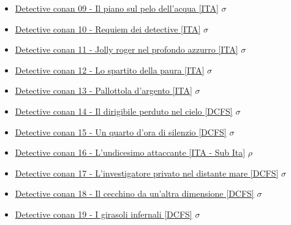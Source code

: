 \begin{itemize}
				\item \href{https://mega.nz/#!5dVBnYQI!Xr37qbfwJcZ3Mf3yrrl5tWFyDnQ4RdwQ-k6Yif0bfgo} {Detective conan 09 - Il piano sul pelo dell'acqua  [ITA]}  $\sigma$   \\
				\item \href{https://mega.nz/#!kQ9wDBTR!yOz1HSF1OcD1P544nv23cEWFpYuPS_ED26GRj0mErZE} {Detective conan 10 - Requiem dei detective  [ITA]}  $\sigma$   \\
				\item \href{https://mega.nz/#!4Y1TVSaB!_UtCZTAy-zGZktxlB15xv_k5KFQRcLPg0NBfiLLOLTM} {Detective conan 11 - Jolly roger nel profondo azzurro  [ITA]}  $\sigma$   \\
				\item \href{https://mega.nz/#!oN1mHJQL!wpBNhW-CmaPloL5mvgznb6zbxdaPEAYJAfMkn4hQw1Y} {Detective conan 12 - Lo spartito della paura  [ITA]}  $\sigma$   \\
				\item \href{https://mega.nz/#!1ZMzmIbQ!QtcmEA1EIv3YrIh4qLDLAjZyHIUQaV_cRgvCTgFOly4} {Detective conan 13 - Pallottola d'argento  [ITA]}  $\sigma$   \\
				\item \href{https://mega.nz/#!ZIFCFaDA!0xsJj6RmWTsoZPUQ0dji6MCG-Dq-uPKXluQ5QPBIQ0g} {Detective conan 14 - Il dirigibile perduto nel cielo  [DCFS]}  $\sigma$   \\
				\item \href{https://mega.nz/#!BdchEYpJ!mBV6_YkXYKSnHF62gSgEjLjbZNMMwiA4dRa_EChSXhE} {Detective conan 15 - Un quarto d'ora di silenzio  [DCFS]}  $\sigma$   \\
				\item \href{https://mega.nz/#!AFIUAbgZ!iJ7uZnc94L11A6ZJOG_z3jVSf-dpSTqY3vb8HjquGDY} {Detective conan 16 - L'undicesimo attaccante  [ITA - Sub Ita]}  $\rho$   \\
				\item \href{https://mega.nz/#!4BkBnQoI!hhraZcMOqiP31Uwat75HU1j1zDZMlOW8jNmaYzAwRmI} {Detective conan 17 - L'investigatore privato nel distante mare  [DCFS]}  $\sigma$   \\
				\item \href{https://mega.nz/#!tR1GRa4J!hQDq5MgmIKy5iGHtwSNbgjrq9DwGpVPskDtAqkpdCL4} {Detective conan 18 - Il cecchino da un'altra dimensione  [DCFS]}  $\sigma$   \\
				\item \href{https://mega.nz/#!oAs0QRSK!f1kenAGHV55uK5L0J9uQWzYgVxPaI6fL7f5EF8VU1bk} {Detective conan 19 - I girasoli infernali [DCFS]}  $\sigma$   \\

\end{itemize}
